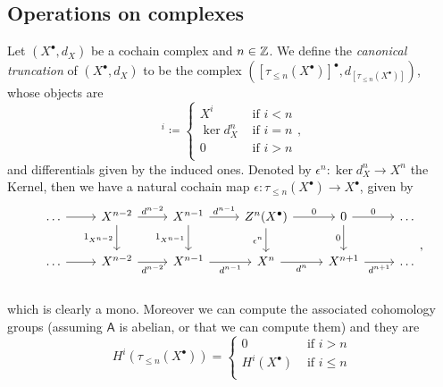 \subsection{Operations on complexes}
\begin{defn}
	Let $\left( X^{\bullet}, d_{X} \right)$ be a cochain complex and $n \in \mathbb{Z}$.
	We define the {\em canonical truncation} of $\left( X^{\bullet}, d_{X} \right)$ to be the complex
	$\left( [\tau_{\leq n}(X^\bullet)]^{\bullet}, d_{[\tau_{\leq n}(X^\bullet)]} \right)$, whose objects are
	\begin{equation}
		[\tau_{\leq n}(X^\bullet)]^i \coloneqq 
	\begin{cases}
		X^i & \text{ if } i < n\\
		\ker d_X^n & \text{ if } i = n\\
		0 & \text{ if } i > n\\
	\end{cases} 
	,\end{equation} 
	and differentials given by the induced ones.
	Denoted by $\epsilon^n\colon \ker d^n_X \to X^n$ the Kernel, then we have a
	natural cochain map $\epsilon\colon \tau_{\leq n}(X^\bullet) \to X^\bullet$, given by
	\begin{equation}
	\begin{tikzcd}
		\ldots \arrow[r, "", rightarrow] &
		X^{n-2} \arrow[r, "d^{n-2}", rightarrow] \arrow[d, "1_{X^{n-2}}"', rightarrow] &
		X^{n-1} \arrow[r, "d^{n-1}", rightarrow] \arrow[d, "1_{X^{n-1}}"', rightarrow] &
		Z^{n}(X^\bullet) \arrow[r, "0", rightarrow] \arrow[d, "\epsilon^{n}"', rightarrow] &
		0 \arrow[r, "0", rightarrow] \arrow[d, "0"', rightarrow] &
		\ldots \\
		\ldots \arrow[r, "", rightarrow] &
		X^{n-2} \arrow[r, "d^{n-2}"', rightarrow] &
		X^{n-1} \arrow[r, "d^{n-1}"', rightarrow] &
		X^{n} \arrow[r, "d^{n}"', rightarrow] &
		X^{n+1} \arrow[r, "d^{n+1}"', rightarrow] &
		\ldots \\
	\end{tikzcd}
	,\end{equation} 
	which is clearly a mono.
	Moreover we can compute the associated cohomology groups
	(assuming $\mathsf{A}$ is abelian, or that we can compute them)
	and they are
	\begin{equation}
		H^i \left( \tau_{\leq n}(X^\bullet) \right) =
		\begin{cases}
			0 & \text{ if } i > n\\
			H^i(X^\bullet) & \text{ if } i \leq n\\

\end{cases}
\end{equation}
\end{defn}
